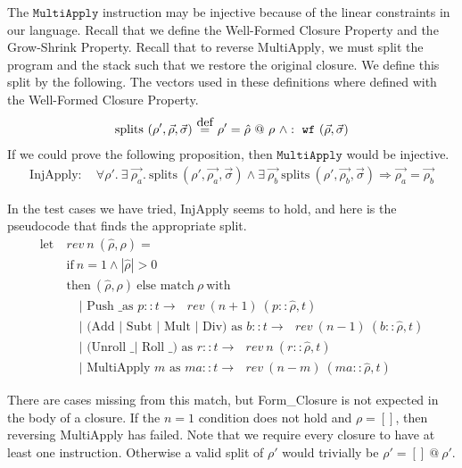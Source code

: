 \documentclass[11pt]{article}
\newcommand\myeq{\stackrel{\mathclap{\normalfont\mbox{def}}}{=}}
\begin{document}
The $\texttt{MultiApply}$ instruction may be injective because of the linear constraints in our language. Recall that we define the Well-Formed Closure Property and the Grow-Shrink Property. Recall that to reverse $\text{MultiApply}$, we must split the program and the stack such that we restore the original closure. We define this split by the following. The vectors used in these definitions where defined with the Well-Formed Closure Property.
\begin{align*}
    \text{splits}\ (\rho', \vec{\rho}, \vec{\sigma})\ \myeq\ \rho' = \hat{\rho}\ @\ \rho\ \wedge : \ \texttt{wf}\ (\vec{\rho}, \vec{\sigma})
\end{align*}
If we could prove the following proposition, then $\texttt{MultiApply}$ would be injective.
\begin{align*}
    \text{InjApply}: \quad \forall \rho'.\ \exists\ \vec{\rho_a}.\ \text{splits}\ (\rho', \vec{\rho_a}, \vec{\sigma}) \wedge \exists\ \vec{\rho_b}\ \text{splits}\ (\rho', \vec{\rho_b}, \vec{\sigma}) \Longrightarrow \vec{\rho_a} = \vec{\rho_b}
\end{align*}

In the test cases we have tried, InjApply seems to hold, and here is the pseudocode that finds the appropriate split.
\begin{align*}
    \text{let}\ &rev\ n\ (\hat{\rho}, \rho) =\\
    &\text{if}\ n = 1  \wedge |\hat{\rho}| > 0\\ 
    &\text{then}\ (\hat{\rho}, \rho)\ \text{else match}\ \rho\ \text{with}\\
    & \quad \text{$|$ Push \_ as $p::t \rightarrow$ } rev\ (n + 1)\ (p::\hat{\rho}, t)\\
    & \quad \text{$|$ (Add $|$ Subt $|$ Mult $|$ Div) as $b::t \rightarrow$ } rev\ (n - 1)\ (b::\hat{\rho}, t)\\
    & \quad \text{$|$ (Unroll \_ $|$ Roll \_) as $r::t \rightarrow$ } rev\ n\ (r::\hat{\rho}, t)\\
    & \quad \text{$|$ MultiApply $m$ as $ma::t \rightarrow$ } rev\ (n - m)\ (ma::\hat{\rho}, t)
\end{align*}

There are cases missing from this match, but Form\_Closure is not expected in the body of a closure. If the $n =1$ condition does not hold and $\rho = []$, then reversing MultiApply has failed. Note that we require every closure to have at least one instruction. Otherwise a valid split of $\rho'$ would trivially be $\rho' = []\ @\ \rho'$.
\end{document}
